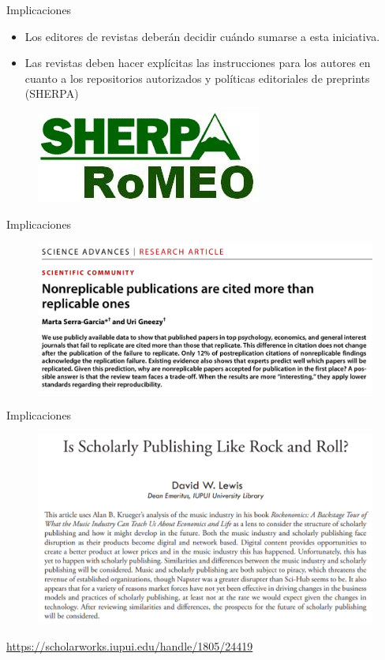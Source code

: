 \documentclass{beamer}
\begin{document}
\begin{frame}{Implicaciones}
\Large
\begin{itemize}
    \item Los editores de revistas deberán decidir cuándo sumarse a esta iniciativa.
    \vspace{0.4cm}
    \pause
    \item Las revistas deben hacer explícitas las instrucciones para los autores en cuanto a los repositorios autorizados y políticas editoriales de preprints (SHERPA)
\end{itemize}    
\begin{figure}
\centering
 \includegraphics[width=.4\textwidth]{SherpaRomeo.jpg}
\end{figure}
\end{frame}

\begin{frame}{Implicaciones}
\begin{figure}
\centering
\includegraphics[width=.75\textwidth]{nonR.png}
\end{figure}
\cite{Serra2021}
\end{frame}

\begin{frame}{Implicaciones}
\begin{figure}
\centering
\includegraphics[width=1\textwidth]{publishing.png}
\end{figure}
\textcolor{blue}{\url{https://scholarworks.iupui.edu/handle/1805/24419}}
\end{frame}
\end{document}
